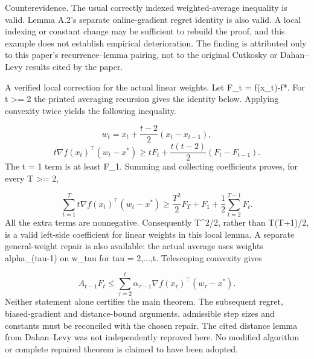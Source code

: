 \documentclass[10pt]{article}
\begin{document}
Counterevidence. The usual correctly indexed weighted-average inequality is valid. Lemma A.2’s separate online-gradient regret identity is also valid. A local indexing or constant change may be sufficient to rebuild the proof, and this example does not establish empirical deterioration. The finding is attributed only to this paper’s recurrence–lemma pairing, not to the original Cutkosky or Dahan–Levy results cited by the paper.\par
A verified local correction for the actual linear weights. Let F\_t = f(x\_t)-f*. For t >= 2 the printed averaging recursion gives the identity below. Applying convexity twice yields the following inequality.\par
\[w_t=x_t+\frac{t-2}{2}(x_t-x_{t-1}),\] \[t\nabla f(x_t)^\top(w_t-x^*)
\ge tF_t+\frac{t(t-2)}2(F_t-F_{t-1}).\] The t = 1 term is at least F\_1. Summing and collecting coefficients proves, for every T >= 2,\par
\[\sum_{t=1}^{T}t\nabla f(x_t)^\top(w_t-x^*)
\ge\frac{T^2}{2}F_T+F_1+\frac12\sum_{t=2}^{T-1}F_t.\] All the extra terms are nonnegative. Consequently T\textasciicircum{}2/2, rather than T(T+1)/2, is a valid left-side coefficient for linear weights in this local lemma. A separate general-weight repair is also available: the actual average uses weights alpha\_(tau-1) on w\_tau for tau = 2,...,t. Telescoping convexity gives\par
\[A_{t-1}F_t\le
\sum_{\tau=2}^{t}\alpha_{\tau-1}
\nabla f(x_\tau)^\top(w_\tau-x^*).\] Neither statement alone certifies the main theorem. The subsequent regret, biased-gradient and distance-bound arguments, admissible step sizes and constants must be reconciled with the chosen repair. The cited distance lemma from Dahan–Levy was not independently reproved here. No modified algorithm or complete repaired theorem is claimed to have been adopted.\par
\end{document}
